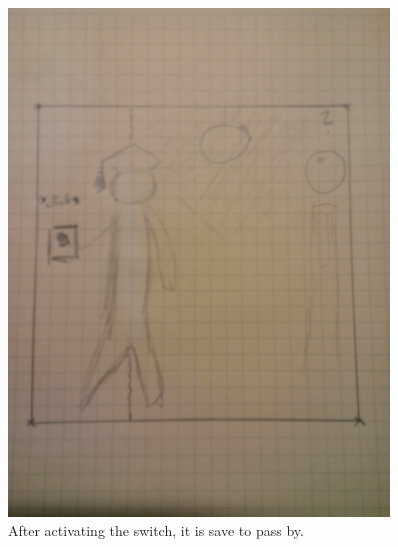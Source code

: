 \documentclass[12pt]{article}
\begin{document}
\begin{figure}
\begin{minipage}{0.45\textwidth}
		\includegraphics[width=0.9\textwidth]{Images/lightoff} %
		\caption{After activating the switch, it is save to pass by.}
	\end{minipage}
\end{figure}
\end{document}
